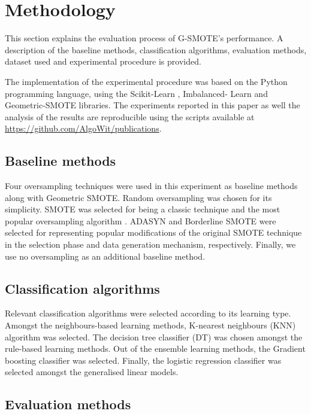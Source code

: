 \documentclass[parskip=full]{scrartcl}
\begin{document}
\section{Methodology}

This section explains the evaluation process of G-SMOTE's performance. A
description of the baseline methods, classification algorithms, evaluation
methods, dataset used and experimental procedure is provided.

The implementation of the experimental procedure was based on the Python
programming language, using the Scikit-Learn \cite{Pedregosa2011}, Imbalanced-
Learn \cite{JMLR:v18:16-365} and Geometric-SMOTE \cite{Douzas2019} libraries.
The experiments reported in this paper as well the analysis of the results are
reproducible using the scripts available at \url{https://github.com/AlgoWit/publications}.

\subsection{Baseline methods}

Four oversampling techniques were used in this experiment as baseline methods
along with Geometric SMOTE. Random oversampling was chosen for its simplicity.
SMOTE was selected for being a classic technique and the most popular
oversampling algorithm \cite{Douzas2019}. ADASYN  and
Borderline SMOTE  were selected for representing popular
modifications of the original SMOTE technique in the selection phase and data
generation mechanism, respectively. Finally, we use no oversampling as an
additional baseline method.

\subsection{Classification algorithms}

Relevant classification algorithms were selected according to its learning
type. Amongst the neighbours-based learning methods, K-nearest neighbours (KNN)
 algorithm was selected. The decision tree classifier
(DT)  was chosen amongst the rule-based learning
methods. Out of the ensemble learning methods, the Gradient boosting classifier
 was selected. Finally, the logistic regression
classifier  was selected amongst the generalised linear
models.

\subsection{Evaluation methods}
\end{document}
